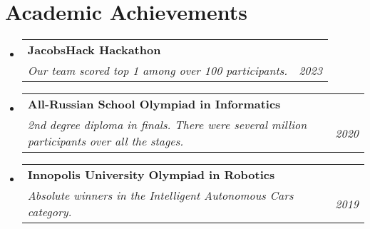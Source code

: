 \documentclass[letterpaper,11pt]{article}
\makeatletter
\newcommand{\resumeSubheading}[4]{
  \vspace{-1pt}\item
    \begin{tabular*}{0.97\textwidth}{l@{\extracolsep{\fill}}r}
      \textbf{#1} & #2 \\
      \textit{\small#3} & \textit{\small #4} \\
    \end{tabular*}\vspace{-5pt}
}
\newcommand{\resumeSubHeadingListStart}{\begin{itemize}[leftmargin=*]}
\newcommand{\resumeSubHeadingListEnd}{\end{itemize}}
\makeatother
\begin{document}
\section{Academic Achievements}
  \resumeSubHeadingListStart
    \resumeSubheading{JacobsHack Hackathon}{}
    {Our team scored top 1 among over 100 participants.}{2023}
    \resumeSubheading{All-Russian School Olympiad in Informatics}{}
    {2nd degree diploma in finals. There were several million participants over all the stages.}{2020}
    \resumeSubheading{Innopolis University Olympiad in Robotics}{}
    {Absolute winners in the Intelligent Autonomous Cars category.}{2019}
  \resumeSubHeadingListEnd


\end{document}
